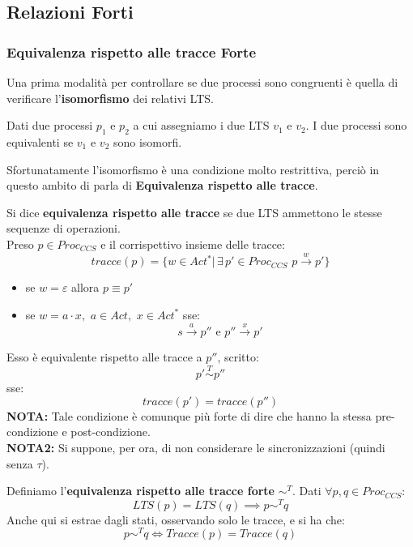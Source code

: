 \subsection{Relazioni Forti}
\subsubsection{Equivalenza rispetto alle tracce Forte}
Una prima modalità per controllare se due processi sono congruenti è quella di verificare l'\textbf{isomorfismo} dei relativi LTS.
\begin{definizione}
  Dati due processi $p_1$ e $p_2$ a cui assegniamo i due LTS $v_1$ e $v_2$. I
  due processi sono equivalenti se $v_1$ e $v_2$ sono isomorfi. 
\end{definizione} \vspace{5mm} %
Sfortunatamente l'isomorfismo è una condizione molto restrittiva, perciò in questo ambito di parla di \textbf{Equivalenza rispetto alle tracce}.
\begin{definizione}
  Si dice \textbf{equivalenza rispetto alle tracce} se due LTS ammettono le stesse sequenze di operazioni.\\
    Preso $p\in Proc_{CCS}$ e il corrispettivo insieme delle tracce:
  \[tracce(p)=\{w\in Act^*|\,\exists\, p'\in Proc_{CCS}
    \,\, p\stackrel{w}{\rightarrow} p'\}\]
  \begin{itemize}
    \item se $w=\varepsilon$ allora $p\equiv p'$
    \item se $w=a\cdot x,\,\, a\in Act,\,\, x\in Act^*$ sse:
    \[s\stackrel{a}{\rightarrow} p'' \mbox{ e } p''\stackrel{x}{\rightarrow}
      p'\]
  \end{itemize}  
  
  Esso è equivalente rispetto alle tracce a $p''$,  scritto:
  \[p'\stackrel{T}{\sim} p''\]
  sse:
  \[tracce(p')=tracce(p'')\]
  \textbf{NOTA:} Tale condizione è comunque più forte di dire che hanno la stessa pre-condizione e post-condizione. \\
  \textbf{NOTA2: } Si suppone, per ora, di non considerare le sincronizzazioni (quindi senza $\tau$). 
\end{definizione} \vspace{5mm} %
\begin{definizione}
  Definiamo l'\textbf{equivalenza rispetto alle tracce forte} $\sim^T$. Dati
  $\forall p, q\in Proc_{CCS}$:
  \[LTS(p)=LTS(q)\implies p\sim^T q\]
  Anche qui si estrae dagli stati, osservando solo le tracce, e si ha che:
  \[p\sim^T q\iff Tracce(p)=Tracce(q)\]
\end{definizione} \vspace{5mm} %
